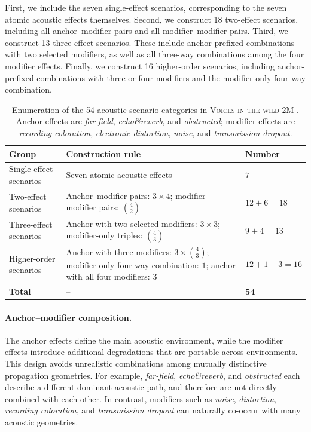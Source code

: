 \documentclass{article}
\begin{document}
First, we include the seven single-effect scenarios, corresponding to the seven
atomic acoustic effects themselves. Second, we construct 18 two-effect
scenarios, including all anchor--modifier pairs and all modifier--modifier
pairs. Third, we construct 13 three-effect scenarios. These include
anchor-prefixed combinations with two selected modifiers, as well as all
three-way combinations among the four modifier effects. Finally, we construct
16 higher-order scenarios, including anchor-prefixed combinations with three or
four modifiers and the modifier-only four-way combination.

\begin{table}[t]
\centering
\small
\setlength{\tabcolsep}{5pt}
\renewcommand{\arraystretch}{1.15}
\caption{Enumeration of the 54 acoustic scenario categories in  \textsc{Voices-in-the-wild-2M} . Anchor effects are \textit{far-field}, \textit{echo\&reverb}, and \textit{obstructed}; modifier effects are \textit{recording coloration}, \textit{electronic distortion}, \textit{noise}, and \textit{transmission dropout}.}
\label{tab:compound_scenario_count}
\begin{tabular}{p{} p{} p{}}
\toprule
\textbf{Group} & \textbf{Construction rule} & \textbf{Number} \\
\midrule
Single-effect scenarios
& Seven atomic acoustic effects
& $7$ \\

Two-effect scenarios
& Anchor--modifier pairs: $3 \times 4$; modifier--modifier pairs: $\binom{4}{2}$
& $12 + 6 = 18$ \\

Three-effect scenarios
& Anchor with two selected modifiers: $3 \times 3$; modifier-only triples: $\binom{4}{3}$
& $9 + 4 = 13$ \\

Higher-order scenarios
& Anchor with three modifiers: $3 \times \binom{4}{3}$; modifier-only four-way combination: $1$; anchor with all four modifiers: $3$
& $12 + 1 + 3 = 16$ \\
\midrule
\textbf{Total}
& --
& $\textbf{54}$ \\
\bottomrule
\end{tabular}
\end{table}

\paragraph{Anchor--modifier composition.}
The anchor effects define the main acoustic environment, while the modifier
effects introduce additional degradations that are portable across environments.
This design avoids unrealistic combinations among mutually distinctive
propagation geometries. For example, \textit{far-field}, \textit{echo\&reverb},
and \textit{obstructed} each describe a different dominant acoustic path, and
therefore are not directly combined with each other. In contrast, modifiers such
as \textit{noise}, \textit{distortion}, \textit{recording coloration},
and \textit{transmission dropout} can naturally co-occur with many acoustic
geometries.
\end{document}
